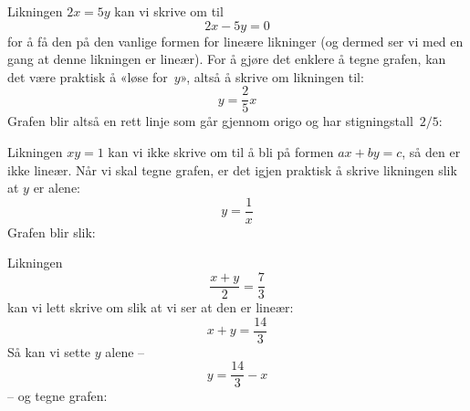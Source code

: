 \begin{losning}
\begin{punkt}
Likningen $2x = 5y$ kan vi skrive om til
\[
2x - 5y = 0
\]
for å få den på den vanlige formen for lineære likninger (og dermed
ser vi med en gang at denne likningen er lineær).  For å gjøre det
enklere å tegne grafen, kan det være praktisk å «løse for~$y$», altså
å skrive om likningen til:
\[
y = \frac{2}{5} x
\]
Grafen blir altså en rett linje som går gjennom origo og har
stigningstall~$2/5$:
\begin{center}
\end{center}
\end{punkt}

\begin{punkt}
Likningen $xy = 1$ kan vi ikke skrive om til å bli på formen
$ax + by = c$, så den er ikke lineær.  Når vi skal tegne grafen, er
det igjen praktisk å skrive likningen slik at $y$ er alene:
\[
y = \frac{1}{x}
\]
Grafen blir slik:
\begin{center}
\end{center}
\end{punkt}

\begin{punkt}
Likningen
\[
\frac{x+y}{2} = \frac{7}{3}
\]
kan vi lett skrive om slik at vi ser at den er lineær:
\[
x + y = \frac{14}{3}
\]
Så kan vi sette $y$ alene --
\[
y = \frac{14}{3} - x
\]
-- og tegne grafen:
\begin{center}
\end{center}
\end{punkt}


\end{losning}
